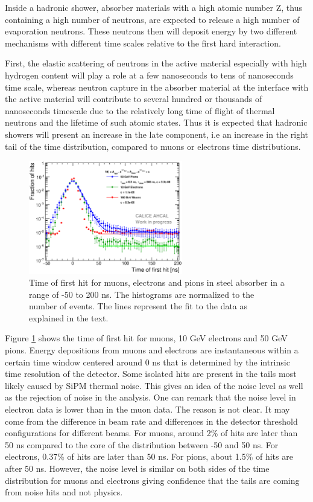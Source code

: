 Inside a hadronic shower, absorber materials with a high atomic number Z, thus containing a high number of neutrons, are expected to release a high number of evaporation neutrons. These neutrons then will deposit energy by two different mechanisms with different time scales relative to the first hard interaction.

First, the elastic scattering of neutrons in the active material especially with high hydrogen content will play a role at a few nanoseconds to tens of nanoseconds time scale, whereas neutron capture in the absorber material at the interface with the active material will contribute to several hundred or thousands of nanoseconds timescale due to the relatively long time of flight of thermal neutrons and the lifetime of such atomic states. Thus it is expected that hadronic showers will present an increase in the late component, i.e an increase in the right tail of the time distribution, compared to muons or electrons time distributions.

\begin{figure}[htbp!]
	\centering
	\includegraphics[width=0.6\textwidth]{../Thesis_Plots/Timing/Pions/Plots/Timing_dNdt_Comparison.eps}
	\caption{Time of first hit for muons, electrons and pions in steel absorber in a range of -50 to 200 ns. The histograms are normalized to the number of events. The lines represent the fit to the data as explained in the text.}
	\label{fig:dNdt_Comparison}
\end{figure}

Figure \ref{fig:dNdt_Comparison} shows the time of first hit for muons, 10 GeV electrons and 50 GeV pions. Energy depositions from muons and electrons are instantaneous within a certain time window centered around 0 ns that is determined by the intrinsic time resolution of the detector. Some isolated hits are present in the tails most likely caused by SiPM thermal noise. This gives an idea of the noise level as well as the rejection of noise in the analysis. One can remark that the noise level in electron data is lower than in the muon data. The reason is not clear. It may come from the difference in beam rate and differences in the detector threshold configurations for different beams. For muons, around 2\% of hits are later than 50 ns compared to the core of the distribution between -50 and 50 ns. For electrons, 0.37\% of hits are later than 50 ns. For pions, about 1.5\% of hits are after 50 ns. However, the noise level is similar on both sides of the time distribution for muons and electrons giving confidence that the tails are coming from noise hits and not physics.

